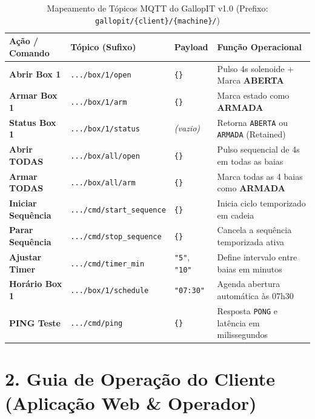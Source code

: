 \documentclass[11pt,a4paper]{article}
\begin{document}
\vspace{0.2cm}

\begin{table}[h!]
\centering
\small
\renewcommand{\arraystretch}{1.25}
\begin{tabular}{@{}p{3.2cm}p{4.8cm}p{2.2cm}p{6.0cm}@{}}
\toprule
\textbf{Ação / Comando} & \textbf{Tópico (Sufixo)} & \textbf{Payload} & \textbf{Função Operacional} \\ \midrule
\textbf{Abrir Box 1} & \texttt{.../box/1/open} & \texttt{\{\}} & Pulso 4s solenoide + Marca \textcolor{gallopred}{\textbf{ABERTA}} \\
\textbf{Armar Box 1} & \texttt{.../box/1/arm} & \texttt{\{\}} & Marca estado como \textcolor{gallopgreen}{\textbf{ARMADA}} \\
\textbf{Status Box 1} & \texttt{.../box/1/status} & \textit{(vazio)} & Retorna \texttt{ABERTA} ou \texttt{ARMADA} (Retained) \\
\textbf{Abrir TODAS} & \texttt{.../box/all/open} & \texttt{\{\}} & Pulso sequencial de 4s em todas as baias \\
\textbf{Armar TODAS} & \texttt{.../box/all/arm} & \texttt{\{\}} & Marca todas as 4 baias como \textcolor{gallopgreen}{\textbf{ARMADA}} \\
\textbf{Iniciar Sequência} & \texttt{.../cmd/start\_sequence} & \texttt{\{\}} & Inicia ciclo temporizado em cadeia \\
\textbf{Parar Sequência} & \texttt{.../cmd/stop\_sequence} & \texttt{\{\}} & Cancela a sequência temporizada ativa \\
\textbf{Ajustar Timer} & \texttt{.../cmd/timer\_min} & \texttt{"5"}, \texttt{"10"} & Define intervalo entre baias em minutos \\
\textbf{Horário Box 1} & \texttt{.../box/1/schedule} & \texttt{"07:30"} & Agenda abertura automática às 07h30 \\
\textbf{PING Teste} & \texttt{.../cmd/ping} & \texttt{\{\}} & Resposta \texttt{PONG} e latência em milissegundos \\ \bottomrule
\end{tabular}
\caption{Mapeamento de Tópicos MQTT do GallopIT v1.0 (Prefixo: \texttt{gallopit/\{client\}/\{machine\}/})}
\end{table}

\newpage

\section*{\textcolor{gallopblue}{2. Guia de Operação do Cliente (Aplicação Web \& Operador)}}
\end{document}

